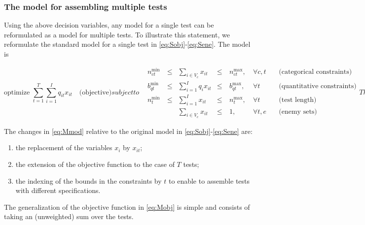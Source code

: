 \subsubsection{The model for assembling multiple tests}

Using the above decision variables, any model for a single test can be reformulated as a model for multiple tests. To illustrate this statement, we reformulate the standard model for a single test in \eqref{eq:Sobj}-\eqref{eq:Sene}.
The model is

\begin{subequations}\label{eq:classTest}
	\begin{equation}\label{eq:Mobj}
	\mbox{optimize } \sum_{t=1}^T{\sum_{i=1}^I q_{it} x_{it}} \quad \mbox{(objective)}
	\end{equation}
	subject to    
	\begin{alignat}{4}
	\label{eq:Mcat}
	&n^{\min}_{ct} \ &\le & \sum_{i \in V_c} x_{it} &\le \ & n^{\max}_{ct}, \ &\forall c,t \quad & \mbox{(categorical constraints)}\\
	\label{eq:Mquan}
	&b^{\min}_{qt} \ &\le & \sum_{i=1}^I q_i x_{it} &\le \ & b^{\max}_{qt}, \ & \forall t \quad & \mbox{(quantitative constraints)}\\
	\label{eq:Mlen}
	&n^{\min}_t \ &\leq& \sum_{i=1}^I x_{it} &\le \ & n^{\max}_t, \  & \forall t \quad &\mbox{(test length)}\\
	\label{eq:Mene}
	&    & & \sum_{i \in V_e} x_{it}&\le \ & 1,   \  & \forall t,e \quad &\mbox{(enemy sets)}
	\end{alignat}
	
	Then, the definition of variables
	
	\begin{equation*}\label{eq:MDV2}
	x_{it} \in \{0,1\}, \ \forall i,t \quad \mbox{(decision variables)}
	\end{equation*}
	\label{eq:Mmod}
\end{subequations}

The changes in \eqref{eq:Mmod} relative to the original model in \eqref{eq:Sobj}-\eqref{eq:Sene} are:
\begin{enumerate}
	\item the replacement of the variables $x_i$ by $x_{it}$;
	\item the extension of the objective function to the case of $T$ tests;
	\item the indexing of the bounds in the constraints by $t$ to enable to assemble tests with different specifications.
\end{enumerate}
The generalization of the objective function in \eqref{eq:Mobj} is simple and consists of taking an (unweighted) sum over the tests.

